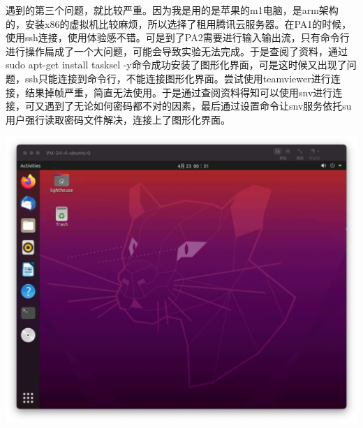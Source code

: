 \documentclass[UTF8,a4paper,10pt]{ctexart}
\begin{document}
遇到的第三个问题，就比较严重。因为我是用的是苹果的m1电脑，是arm架构的，安装x86的虚拟机比较麻烦，所以选择了租用腾讯云服务器。在PA1的时候，使用ssh连接，使用体验感不错。可是到了PA2需要进行输入输出流，只有命令行进行操作扁成了一个大问题，可能会导致实验无法完成。于是查阅了资料，通过sudo apt-get install tasksel -y命令成功安装了图形化界面，可是这时候又出现了问题，ssh只能连接到命令行，不能连接图形化界面。尝试使用teamviewer进行连接，结果掉帧严重，简直无法使用。于是通过查阅资料得知可以使用snv进行连接，可又遇到了无论如何密码都不对的因素，最后通过设置命令让snv服务依托su用户强行读取密码文件解决，连接上了图形化界面。
\begin{center}
  \includegraphics*[scale = 0.35]{截屏2022-04-23 00.31.46.png}
\end{center}
\end{document}

